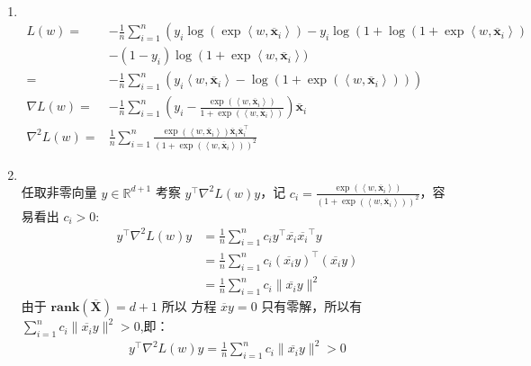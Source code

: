 \documentclass[11pt,letter,notitlepage]{article}
\newcommand{\rank}[1]{ \textbf{rank}  (#1)  }
\begin{document}
\begin{solution}
	\heiti
	\ \\
	\begin{enumerate}
		\item \ \\
		\begin{align*}
			L(w)=&-\frac{1}{n} \sum\limits_{i=1}^{n}\left(y_{i} \log \left(\exp \left<w, \overline{\mathbf{x}}_i\right>\right)-y_{i} \log \left(1+\log \left(1+\exp \left<w, \overline{\mathbf{x}}_i\right>\right)\right.\right.\\ &-\left(1-y_{i}\right) \log \left(1+\exp \left<w,\overline{\mathbf{x}}_i\right>)\right.\\=&-\frac{1}{n} \sum_{i=1}^{n}\left(y_{i}\left<w,\overline{\mathbf{x}}_i\right>-\log \left(1+\exp \left(\left<w, \overline{\mathbf{x}}_i\right>\right)\right)\right) \\ \nabla L(w)=&-\frac{1}{n} \sum_{i=1}^{n}\left(y_{i}-\frac{\exp \left(\left<w, \overline{\mathbf{x}}_i\right>\right)}{1+\exp \left(\left<w, \overline{\mathbf{x}}_i\right>\right)}\right) \overline{\mathbf{x}}_i\\
			\nabla^{2} L(w)=&\frac{1}{n} \sum_{i=1}^{n} \frac{\exp \left(\left<w, \overline{\mathbf{x}}_i\right>\right) \overline{\mathbf{x}}_i\overline{\mathbf{x}}_i^{\top}}{\left(1+\exp \left(\left<w, \overline{\mathbf{x}}_i\right>\right)\right)^{2}}
		\end{align*}
	\item \ \\
	任取非零向量 $y \in\mathbb{R}^{d+1}$ 考察 $ {y}^{\top}\nabla^{2} L(w) y$，记 $c_i = \frac{\exp \left(\left<w, \overline{\mathbf{x}}_i\right>\right)}{\left(1+\exp \left(\left<w, \overline{\mathbf{x}}_i\right>\right)\right)^{2}}$，容易看出 $c_i > 0$:
	\begin{align*}
		{y}^{\top}\nabla^{2} L(w) y &= \frac{1}{n}\sum\limits_{i=1}^{n}c_i y^{\top}\overline{x_i}\overline{x_i}^{\top}y\\
		&=\frac{1}{n}\sum\limits_{i=1}^{n}c_i(\overline{x_i}y)^{\top}(\overline{x_i}y)\\
		&=\frac{1}{n}\sum\limits_{i=1}^{n}c_i\|\overline{x_i}y \|^2
	\end{align*}
	由于 $\rank{\overline{\mathbf{X}}}=d+1$ 所以 方程 $\overline{x}y=0$ 只有零解，所以有$\sum\limits_{i=1}^{n}c_i\|\overline{x_i}y \|^2 > 0$,即：
	\begin{align*}
		{y}^{\top}\nabla^{2} L(w) y =\frac{1}{n}\sum\limits_{i=1}^{n}c_i\|\overline{x_i}y \|^2 > 0
	\end{align*}

\end{enumerate}
\end{solution}
\end{document}
